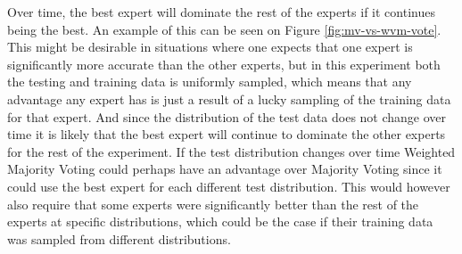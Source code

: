 Over time, the best expert will dominate the rest of the experts if it continues being the best. An example of this can be seen on Figure \ref{fig:mv-vs-wvm-vote}. This might be desirable in situations where one expects that one expert is significantly more accurate than the other experts, but in this experiment both the testing and training data is uniformly sampled, which means that any advantage any expert has is just a result of a lucky sampling of the training data for that expert. And since the distribution of the test data does not change over time it is likely that the best expert will continue to dominate the other experts for the rest of the experiment. If the test distribution changes over time Weighted Majority Voting could perhaps have an advantage over Majority Voting since it could use the best expert for each different test distribution. This would however also require that some experts were significantly better than the rest of the experts at specific distributions, which could be the case if their training data was sampled from different distributions.

